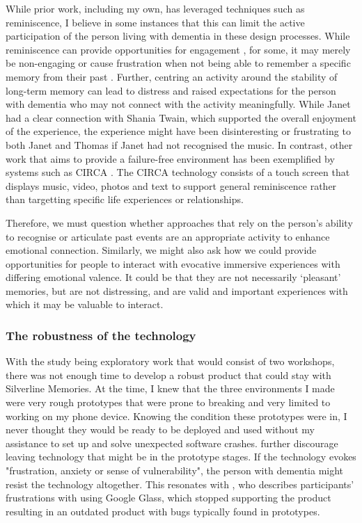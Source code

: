 While prior work, including my own, has leveraged techniques such as reminiscence, I believe in some instances that this can limit the active participation of the person living with dementia in these design processes. While reminiscence can provide opportunities for engagement \citep{gowans_designing_2004, yasuda_effectiveness_2009}, for some, it may merely be non-engaging or cause frustration when not being able to remember a specific memory from their past \citep{lazar_using_2014}. Further, centring an activity around the stability of long-term memory can lead to distress and raised expectations for the person with dementia who may not connect with the activity meaningfully. While Janet had a clear connection with Shania Twain, which supported the overall enjoyment of the experience, the experience might have been disinteresting or frustrating to both Janet and Thomas if Janet had not recognised the music. In contrast, other work that aims to provide a failure-free environment has been exemplified by systems such as CIRCA \citep{alm_communication_2007}. The CIRCA technology consists of a touch screen that displays music, video, photos and text to support general reminiscence rather than targetting specific life experiences or relationships.

Therefore, we must question whether approaches that rely on the person’s ability to recognise or articulate past events are an appropriate activity to enhance emotional connection. Similarly, we might also ask how we could provide opportunities for people to interact with evocative immersive experiences with differing emotional valence. It could be that they are not necessarily ‘pleasant’ memories, but are not distressing, and are valid and important experiences with which it may be valuable to interact.

\subsubsection{The robustness of the technology}
\label{S1:Robustness}
With the study being exploratory work that would consist of two workshops, there was not enough time to develop a robust product that could stay with Silverline Memories. At the time, I knew that the three environments I made were very rough prototypes that were prone to breaking and very limited to working on my phone device. Knowing the condition these prototypes were in, I never thought they would be ready to be deployed and used without my assistance to set up and solve unexpected software crashes. \cite{hwang2020exploring} further discourage leaving technology that might be in the prototype stages. If the technology evokes "frustration, anxiety or sense of vulnerability", the person with dementia might resist the technology altogether. This resonates with \cite{vines_our_2017}, who describes participants' frustrations with using Google Glass, which stopped supporting the product resulting in an outdated product with bugs typically found in prototypes. 

